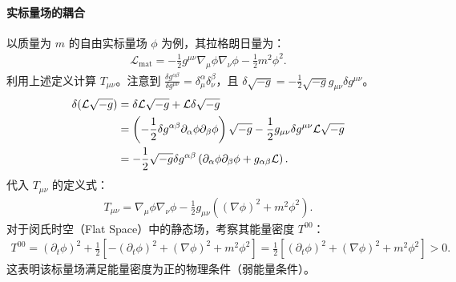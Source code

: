 \paragraph{实标量场的耦合}
以质量为 $m$ 的自由实标量场 $\phi$ 为例，其拉格朗日量为：
\begin{align}
\mathcal{L}_{\text{mat}} = -\frac{1}{2} g^{\mu\nu} \nabla_\mu \phi \nabla_\nu \phi - \frac{1}{2} m^2 \phi^2.
\end{align}
利用上述定义计算 $T_{\mu\nu}$。注意到 $\frac{\delta g^{\alpha\beta}}{\delta g^{\mu\nu}} = \delta^\alpha_\mu \delta^\beta_\nu$，且 $\delta \sqrt{-g} = -\frac{1}{2}\sqrt{-g} g_{\mu\nu} \delta g^{\mu\nu}$。
\begin{align}
\delta (\mathcal{L}\sqrt{-g}) &= \delta \mathcal{L} \sqrt{-g} + \mathcal{L} \delta \sqrt{-g} \notag \\
&= \left( -\frac{1}{2} \delta g^{\alpha\beta} \partial_\alpha \phi \partial_\beta \phi \right) \sqrt{-g} - \frac{1}{2} g_{\mu\nu} \delta g^{\mu\nu} \mathcal{L} \sqrt{-g} \notag \\
&= -\frac{1}{2} \sqrt{-g} \delta g^{\alpha\beta} \left( \partial_\alpha \phi \partial_\beta \phi + g_{\alpha\beta} \mathcal{L} \right).
\end{align}
代入 $T_{\mu\nu}$ 的定义式：
\begin{align}
T_{\mu\nu} = \nabla_\mu \phi \nabla_\nu \phi - \frac{1}{2} g_{\mu\nu} \left( (\nabla\phi)^2 + m^2\phi^2 \right).
\end{align}
对于闵氏时空（Flat Space）中的静态场，考察其能量密度 $T^{00}$：
\begin{align}
T^{00} = (\partial_t \phi)^2 + \frac{1}{2} \left[ -(\partial_t \phi)^2 + (\nabla \phi)^2 + m^2 \phi^2 \right] = \frac{1}{2} \left[ (\partial_t \phi)^2 + (\nabla \phi)^2 + m^2 \phi^2 \right] > 0.
\end{align}
这表明该标量场满足能量密度为正的物理条件（弱能量条件）。